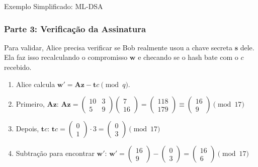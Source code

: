 \documentclass{beamer}
\begin{document}
\begin{frame}{Exemplo Simplificado: ML-DSA}
    \frametitle{Parte 3: Verificação da Assinatura}
       
    Para validar, Alice precisa verificar se Bob realmente usou a chave secreta $\mathbf{s}$ dele. Ela faz isso recalculando o compromisso $\mathbf{w}$ e checando se o hash bate com o $c$ recebido.
    \begin{enumerate}
        \item<+-> Alice calcula $\mathbf{w'} = \mathbf{A}\mathbf{z} - \mathbf{t}c \pmod q$.
        
        \item<+-> Primeiro, $\mathbf{A}\mathbf{z}$:
        $ \mathbf{A}\mathbf{z} = \begin{pmatrix} 10 & 3 \\ 5 & 9 \end{pmatrix} \begin{pmatrix} 7 \\ 16 \end{pmatrix} = \begin{pmatrix} 118 \\ 179 \end{pmatrix} \equiv \begin{pmatrix} 16 \\ 9 \end{pmatrix} \pmod{17} $
        
        \item<+-> Depois, $\mathbf{t}c$:
        $ \mathbf{t}c = \begin{pmatrix} 0 \\ 1 \end{pmatrix} \cdot 3 = \begin{pmatrix} 0 \\ 3 \end{pmatrix} \pmod{17} $
        
        \item<+-> Subtração para encontrar $\mathbf{w'}$:
        $ \mathbf{w'} = \begin{pmatrix} 16 \\ 9 \end{pmatrix} - \begin{pmatrix} 0 \\ 3 \end{pmatrix} = \begin{pmatrix} 16 \\ 6 \end{pmatrix} \pmod{17} $
        

\end{enumerate}
\end{frame}
\end{document}
